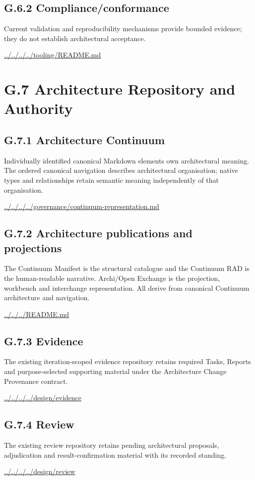 \documentclass[10pt,a4paper]{article}
\begin{document}
\subsection*{G.6.2 Compliance/conformance}
Current validation and reproducibility mechanisms provide bounded evidence; they do not establish architectural acceptance.\par
{\footnotesize\url{../../../../tooling/README.md}}\par
\section*{G.7 Architecture Repository and Authority}
\subsection*{G.7.1 Architecture Continuum}
Individually identified canonical Markdown elements own architectural meaning. The ordered canonical navigation describes architectural organisation; native types and relationships retain semantic meaning independently of that organisation.\par
{\footnotesize\url{../../../../governance/continuum-representation.md}}\par
\subsection*{G.7.2 Architecture publications and projections}
The Continuum Manifest is the structural catalogue and the Continuum RAD is the human-readable narrative. Archi/Open Exchange is the projection, workbench and interchange representation. All derive from canonical Continuum architecture and navigation.\par
{\footnotesize\url{../../../README.md}}\par
\subsection*{G.7.3 Evidence}
The existing iteration-scoped evidence repository retains required Tasks, Reports and purpose-selected supporting material under the Architecture Change Provenance contract.\par
{\footnotesize\url{../../../../design/evidence}}\par
\subsection*{G.7.4 Review}
The existing review repository retains pending architectural proposals, adjudication and result-confirmation material with its recorded standing.\par
{\footnotesize\url{../../../../design/review}}\par
\end{document}
